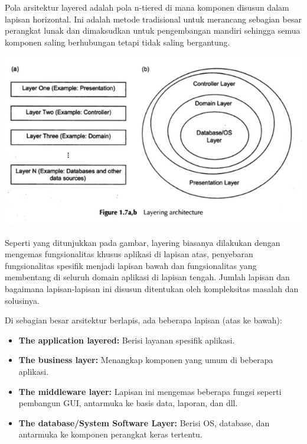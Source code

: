 \documentclass[a4paper,12pt]{article}
\begin{document}
	Pola arsitektur layered adalah pola n-tiered di mana komponen disusun dalam lapisan horizontal. Ini adalah metode tradisional untuk merancang sebagian besar perangkat lunak dan dimaksudkan untuk pengembangan mandiri sehingga semua komponen saling berhubungan tetapi tidak saling bergantung.
	
	\includegraphics{Layering Architecture.jpg}
	
	Seperti yang ditunjukkan pada gambar, layering biasanya dilakukan dengan mengemas fungsionalitas khusus aplikasi di lapisan atas, penyebaran fungsionalitas spesifik menjadi lapisan bawah dan fungsionalitas yang membentang di seluruh domain aplikasi di lapisan tengah. Jumlah lapisan dan bagaimana lapisan-lapisan ini disusun ditentukan oleh kompleksitas masalah dan solusinya.
	
	Di sebagian besar arsitektur berlapis, ada beberapa lapisan (atas ke bawah):
	
	\begin{itemize}
		\item \textbf{The application layered:} Berisi layanan spesifik aplikasi.
		\item \textbf{The business layer:} Menangkap komponen yang umum di beberapa aplikasi.
		\item \textbf{The middleware layer:} Lapisan ini mengemas beberapa fungsi seperti pembangun GUI, antarmuka ke basis data, laporan, dan dll.
		\item \textbf{The database/System Software Layer:} Berisi OS, database, dan antarmuka ke komponen perangkat keras tertentu.
	\end{itemize}
\end{document}
